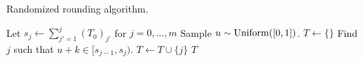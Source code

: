 \begin{algorithm}[h!]
\caption{Randomized rounding algorithm.}
\label{alg:round}
\begin{algorithmic}[1]
\State Let $s_j \gets \sum_{j'=1}^j (T_0)_{j'}$ for $j = 0,\ldots,m$ 
\State Sample $u \sim \operatorname{Uniform}([0,1])$.
\State $T \gets \{\}$
\State Find $j$ such that $u+k \in [s_{j-1},s_j)$.
\State $T \gets T \cup \{j\}$
\EndFor
\State \Return $T$
\EndProcedure
\end{algorithmic}
\end{algorithm}

